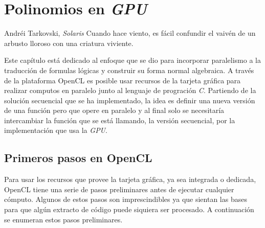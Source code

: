 \chapter{Polinomios en \textit{GPU}}

\begin{chapquote}{Andréi Tarkovski, \textit{Solaris}}
Cuando hace viento, es fácil confundir el vaivén de un arbusto lloroso con una criatura viviente.
\end{chapquote}

Este capítulo está dedicado al enfoque que se dio para incorporar paralelismo a la traducción de formulas lógicas y construir su forma normal algebraica. A través de la plataforma OpenCL\cite{opencl} es posible usar recursos de la tarjeta gráfica para realizar computos en paralelo junto al lenguaje de progración \textit{C}. Partiendo de la solución secuencial que se ha implementado, la idea es definir una nueva versión de una función pero que opere en paralelo y al final solo se necesitaría intercambiar la función que se está llamando, la versión secuencial, por la implementación que usa la \textit{GPU}.

\section{Primeros pasos en OpenCL}

Para usar los recursos que provee la tarjeta gráfica, ya sea integrada o dedicada, OpenCL tiene una serie de pasos preliminares antes de ejecutar cualquier cómputo. Algunos de estos pasos son imprescindibles ya que sientan las bases para que algún extracto de código puede siquiera ser procesado. A continuación se enumeran estos pasos preliminares.

